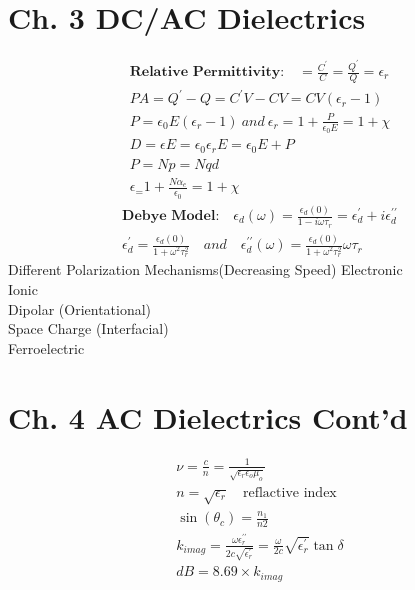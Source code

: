 \begin{multicols}{3}
\section{Ch. 3 DC/AC Dielectrics}
\begin{align} 
\textbf{Relative Permittivity:} \quad = \frac{C^\prime}{C}=\frac{Q^\prime}{Q}
= \epsilon_r \\
PA=Q^\prime - Q = C^\prime V - CV= CV(\epsilon_r-1) \\
P= \epsilon_0E(\epsilon_r-1) \ and \ \epsilon_r=1+\frac{P}{\epsilon_0E}= 1+\chi \\
D = \epsilon E = \epsilon_0 \epsilon_r E = \epsilon_0 E+ P \\
P = Np = Nqd \\
\epsilon_= 1 + \frac{N \alpha_e}{\epsilon_0}=1+\chi
\end{align}
\begin{align}
\textbf{Debye Model:} \quad 
\epsilon_d(\omega)= \frac{\epsilon_d(0)}{1-i\omega \tau_r}=\epsilon_d^\prime+i\epsilon_d^{\prime \prime}\\
\epsilon_d^\prime= \frac{\epsilon_d(0)}{1+\omega^2 \tau_r^2} \quad and \quad \epsilon_d^{\prime \prime}(\omega)= \frac{\epsilon_d(0)}{1+\omega^2 \tau_r^2}\omega \tau_r
\end{align}
Different Polarization Mechanisms(Decreasing Speed)
Electronic	\\
Ionic	\\
Dipolar (Orientational)	\\
Space Charge (Interfacial)	\\
Ferroelectric
\section{Ch. 4 AC Dielectrics Cont'd}
\begin{align}
\nu =\frac{c}{n}= \frac{1}{\sqrt{\epsilon_r \epsilon_o \mu_o}} \\
n = \sqrt{\epsilon_r} \quad \text{reflactive index} \\
\sin(\theta_c)=\frac{n_1}{n2} \\
k_{imag}=\frac{\omega \epsilon_r^{\prime \prime}}{2c\sqrt{\epsilon_r^\prime}}= \frac{\omega}{2c}\sqrt{\epsilon_r^\prime}\tan{\delta} \\
dB = 8.69 \times k_{imag}
\end{align}

\end{multicols}
